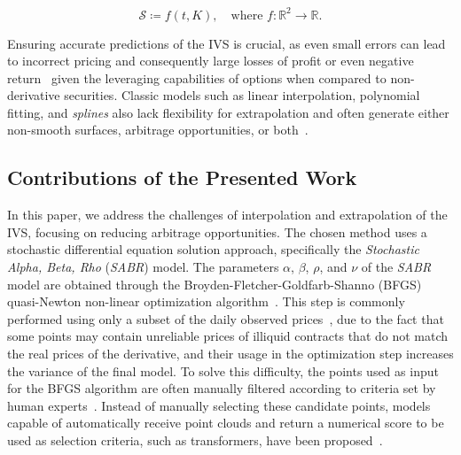\begin{equation}
    \label{eq:ivs}
    \mathcal{S} \coloneqq f(t, K), \quad \text{where } f \colon \mathbb{R}^{2} \to \mathbb{R}.
\end{equation}

Ensuring accurate predictions of the IVS is crucial, as even small errors can lead to incorrect pricing and consequently
large losses of profit or even negative return~\cite{Hagan2014} given the leveraging capabilities of options when compared to non-derivative securities.
Classic models such as linear interpolation, polynomial fitting, and \textit{splines} also lack flexibility for extrapolation
and often generate either non-smooth surfaces, arbitrage opportunities, or both~\cite{Hagan2014}.

\subsection{Contributions of the Presented Work}
\label{subsec:contributions}

In this paper, we address the challenges of interpolation and extrapolation of the IVS, focusing on reducing arbitrage opportunities.
The chosen method uses a stochastic differential equation solution approach, specifically the \textit{Stochastic Alpha, Beta, Rho} (\textit{SABR}) model.
The parameters $\alpha$, $\beta$, $\rho$, and $\nu$ of the \textit{SABR} model are obtained through the
Broyden-Fletcher-Goldfarb-Shanno (BFGS) quasi-Newton non-linear optimization algorithm~\cite{Broyden1970, Fletcher1970, Goldfarb1970, Shanno1970}.
This step is commonly performed using only a subset of the daily observed prices~\cite{Kim2021},
due to the fact that some points may contain unreliable prices of illiquid contracts that do not match the real prices of the derivative,
and their usage in the optimization step increases the variance of the final model.
To solve this difficulty, the points used as input for the BFGS algorithm are often manually filtered according to criteria set by human experts~\cite{Hagan2002}.
Instead of manually selecting these candidate points, models capable of automatically receive point clouds and return a numerical score to be used as selection criteria,
such as transformers, have been proposed~\cite{Cao2020, Kim2021, Bae2024, Jerbi2020}.

